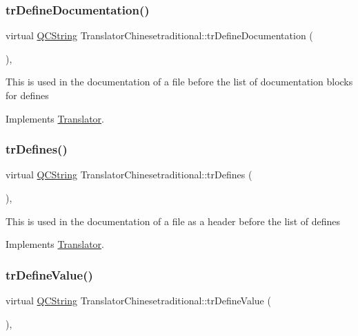 \subsubsection{\texorpdfstring{trDefineDocumentation()}{trDefineDocumentation()}}
{\footnotesize\ttfamily virtual \mbox{\hyperlink{class_q_c_string}{Q\+C\+String}} Translator\+Chinesetraditional\+::tr\+Define\+Documentation (\begin{DoxyParamCaption}{ }\end{DoxyParamCaption})\hspace{0.3cm}{\ttfamily [inline]}, {\ttfamily [virtual]}}

This is used in the documentation of a file before the list of documentation blocks for defines 

Implements \mbox{\hyperlink{class_translator}{Translator}}.

\mbox{\label{class_translator_chinesetraditional_ade896d737b8e80dd3d5573be1c37ebce}} 
\subsubsection{\texorpdfstring{trDefines()}{trDefines()}}
{\footnotesize\ttfamily virtual \mbox{\hyperlink{class_q_c_string}{Q\+C\+String}} Translator\+Chinesetraditional\+::tr\+Defines (\begin{DoxyParamCaption}{ }\end{DoxyParamCaption})\hspace{0.3cm}{\ttfamily [inline]}, {\ttfamily [virtual]}}

This is used in the documentation of a file as a header before the list of defines 

Implements \mbox{\hyperlink{class_translator}{Translator}}.

\mbox{\label{class_translator_chinesetraditional_a28a2c7f00f59d94cb514868bce7e02a1}} 
\subsubsection{\texorpdfstring{trDefineValue()}{trDefineValue()}}
{\footnotesize\ttfamily virtual \mbox{\hyperlink{class_q_c_string}{Q\+C\+String}} Translator\+Chinesetraditional\+::tr\+Define\+Value (\begin{DoxyParamCaption}{ }\end{DoxyParamCaption})\hspace{0.3cm}{\ttfamily [inline]}, {\ttfamily [virtual]}}

